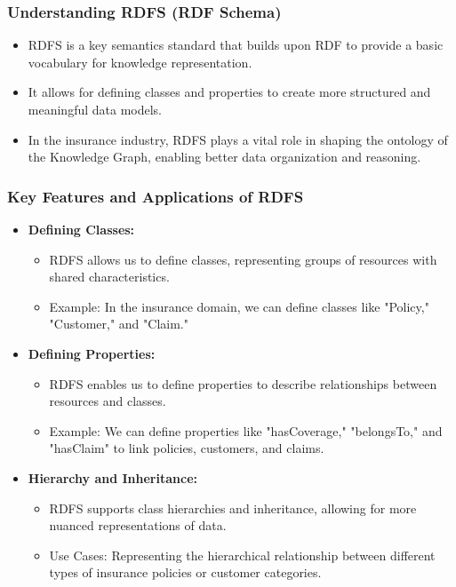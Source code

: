 \begin{frame}[fragile]
\frametitle{Understanding RDFS (RDF Schema)}
\begin{itemize}
\item RDFS is a key semantics standard that builds upon RDF to provide a basic vocabulary for knowledge representation.
\item It allows for defining classes and properties to create more structured and meaningful data models.
\item In the insurance industry, RDFS plays a vital role in shaping the ontology of the Knowledge Graph, enabling better data organization and reasoning.
\end{itemize}
\end{frame}

\begin{frame}[fragile]
\frametitle{Key Features and Applications of RDFS}
\begin{itemize}
\item \textbf{Defining Classes:}
\begin{itemize}
\item RDFS allows us to define classes, representing groups of resources with shared characteristics.
\item Example: In the insurance domain, we can define classes like "Policy," "Customer," and "Claim."
\end{itemize}

\item \textbf{Defining Properties:}
\begin{itemize}
\item RDFS enables us to define properties to describe relationships between resources and classes.
\item Example: We can define properties like "hasCoverage," "belongsTo," and "hasClaim" to link policies, customers, and claims.
\end{itemize}

\item \textbf{Hierarchy and Inheritance:}
\begin{itemize}
\item RDFS supports class hierarchies and inheritance, allowing for more nuanced representations of data.
\item Use Cases: Representing the hierarchical relationship between different types of insurance policies or customer categories.
\end{itemize}
\end{itemize}
\end{frame}

